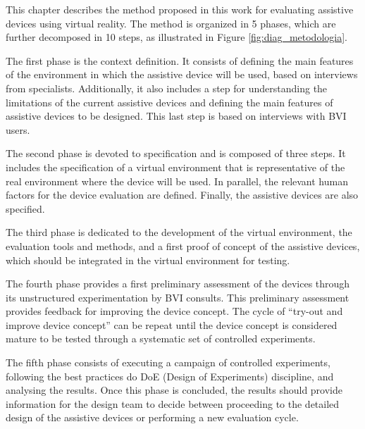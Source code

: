 


This chapter describes the method proposed in this work for evaluating assistive devices using virtual reality. The method is organized in 5 phases, which are further decomposed in 10 steps, as illustrated in Figure \ref{fig:diag_metodologia}.





The first phase is the context definition. It consists of defining the main features of the environment in which the assistive device will be used, based on interviews from specialists. Additionally, it also includes a step for understanding the limitations of the current assistive devices and defining the main features of assistive devices to be designed. This last step is based on interviews with BVI users.

The second phase is devoted to specification and is composed of three steps. It includes the specification of a virtual environment that is representative of the real environment where the device will be used. In parallel, the relevant human factors for the device evaluation are defined. Finally, the assistive devices are also specified.

The third phase is dedicated to the development of the virtual environment, the evaluation tools and methods, and a first proof of concept of the assistive devices, which should be integrated in the virtual environment for testing. 

The fourth phase provides a first preliminary assessment of the devices through its unstructured experimentation by BVI consults. This preliminary assessment provides feedback for improving the device concept. The cycle of “try-out and improve device concept” can be repeat until the device concept is considered mature to be tested through a systematic set of controlled experiments.

The fifth phase consists of executing a campaign of controlled experiments, following the best practices do DoE (Design of Experiments) discipline, and analysing the results. Once this phase is concluded, the results should provide information for the design team to decide between proceeding to the detailed design of the assistive devices or performing a new evaluation cycle. 

